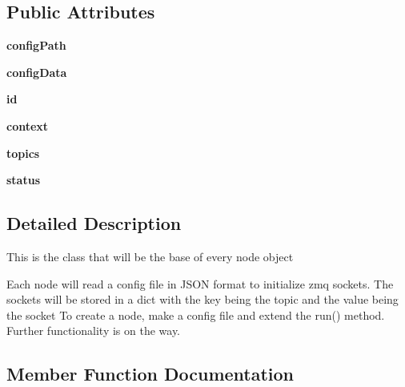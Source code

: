 \subsection*{Public Attributes}
\begin{DoxyCompactItemize}
\item 
\mbox{\label{classsrc_1_1_node_1_1_node_aa709af7372ee1d8b16b8a4b583797fbc}} 
{\bfseries config\+Path}
\item 
\mbox{\label{classsrc_1_1_node_1_1_node_ab86465c66479a6e188cd896e73e7c4d9}} 
{\bfseries config\+Data}
\item 
\mbox{\label{classsrc_1_1_node_1_1_node_a3b5886ac2b9f9aa3312cb5ed51d24e94}} 
{\bfseries id}
\item 
\mbox{\label{classsrc_1_1_node_1_1_node_aa95cc469e47c4a0a91be78f455ca9076}} 
{\bfseries context}
\item 
\mbox{\label{classsrc_1_1_node_1_1_node_a42eedcf5673b8f2285da2d4ce0f4316d}} 
{\bfseries topics}
\item 
\mbox{\label{classsrc_1_1_node_1_1_node_abc9e6fffd4ae8b4c2afa39bfd1c77347}} 
{\bfseries status}
\end{DoxyCompactItemize}


\subsection{Detailed Description}
\begin{DoxyVerb}This is the class that will be the base of every node object

Each node will read a config file in JSON format to initialize zmq sockets.
The sockets will be stored in a dict with the key being the topic and the value being the socket
To create a node, make a config file and extend the run() method.
Further functionality is on the way.
\end{DoxyVerb}
 

\subsection{Member Function Documentation}
\mbox{\label{classsrc_1_1_node_1_1_node_a28f03366fdb99400001080178be63525}} 

